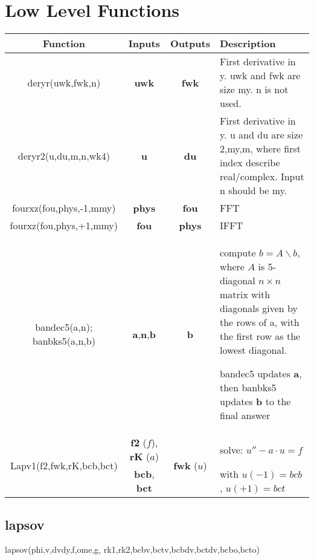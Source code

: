\documentclass[titlepage,12pt,letter]{article}
\numberwithin{equation}{section}
\begin{document}
\section{Low Level Functions}
\begin{table}[H]
	\centering 
	\renewcommand{\arraystretch}{1.4} 
	\begin{tabular}{c|c|c|m{6.7cm}}
		Function&Inputs&Outputs&Description \\ \hline
		deryr(uwk,fwk,n)& \textbf{uwk} & \textbf{fwk} & First derivative in y. uwk and fwk are size my. n is not used.\\
		deryr2(u,du,m,n,wk4)& \textbf{u} & \textbf{du} & First derivative in y. u and du are size 2,my,m, where first index describe real/complex. Input n should be my.\\ \hline
		fourxz(fou,phys,-1,mmy)&\textbf{phys}& \textbf{fou} & FFT\\
		fourxz(fou,phys,+1,mmy)&\textbf{fou}& \textbf{phys} & IFFT\\ \hline		
		bandec5(a,n); banbks5(a,n,b)&\textbf{a},\textbf{n},\textbf{b}&\textbf{b}& compute $b = A\backslash b$, where $A$ is 5-diagonal $n\times n$ matrix with diagonals given by the rows of a, with the first row as the lowest diagonal. 
		
		bandec5 updates \textbf{a}, then banbks5 updates \textbf{b} to the final answer\\ \hline
		\multirow{2}{*}{Lapv1(f2,fwk,rK,bcb,bct)}&\textbf{f2} ($f$), \textbf{rK} ($a$)& \multirow{2}{*}{\textbf{fwk} ($u$)}  &solve: $u'' - a\cdot u = f$	\\
		&\textbf{bcb}, \textbf{bct}& & with $u(-1)= bcb$, $u(+1)= bct$\\ 

	\end{tabular} 
\end{table} 

\subsection{lapsov}

lapsov(phi,v,dvdy,f,ome,g, rk1,rk2,bcbv,bctv,bcbdv,bctdv,bcbo,bcto)
\end{document}
